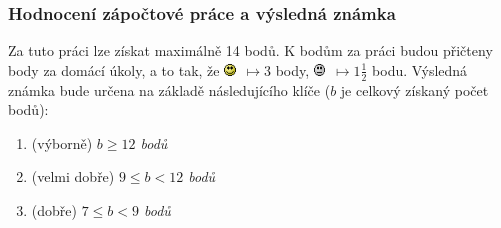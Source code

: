 \documentclass[a4paper,10pt,twoside]{article}
\begin{document}
\subsubsection*{Hodnocení zápočtové práce a výsledná známka}
Za tuto práci lze získat maximálně 14 bodů.
K bodům za práci budou přičteny body za domácí úkoly, a to tak, že \includegraphics[width=0.3cm]{ano.png}~$\mapsto3$ body, \includegraphics[width=0.3cm]{maybe_bw.png}~$\mapsto1\frac{1}{2}$ bodu.
Výsledná známka bude určena na základě následujícího klíče ($b$ je celkový získaný počet bodů):
\begin{enumerate}
	\item (výborně) \emph{$b\geq12$ bodů}
	\item (velmi dobře) \emph{$9\leq b<12$ bodů}
	\item (dobře) \emph{$7\leq b<9$ bodů}
\end{enumerate}
\end{document}
